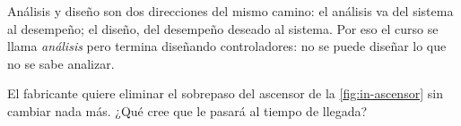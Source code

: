Análisis y diseño son dos direcciones del mismo camino: el análisis va del sistema al desempeño; el diseño, del desempeño deseado al sistema. Por eso el curso se llama \emph{análisis} pero termina diseñando controladores: no se puede diseñar lo que no se sabe analizar.

\begin{pausa}
El fabricante quiere eliminar el sobrepaso del ascensor de la \cref{fig:in-ascensor} sin cambiar nada más. ¿Qué cree que le pasará al tiempo de llegada?
\end{pausa}
